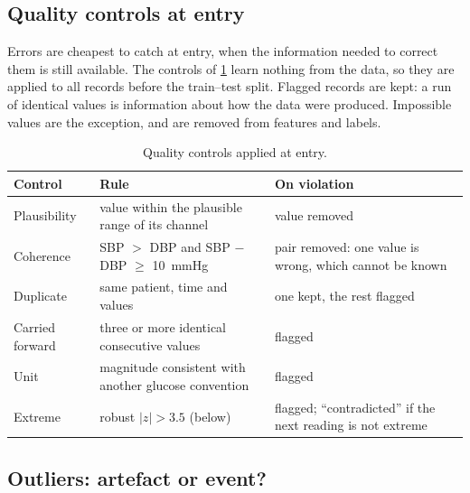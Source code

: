 \documentclass[11pt,a4paper,oneside]{report}
\begin{document}
\subsection{Quality controls at entry}\label{sec:quality}\label{sec:ingestion}

Errors are cheapest to catch at entry, when the information needed to correct them is still available. The controls of \cref{tab:quality-controls} learn nothing from the data, so they are applied to all records before the train--test split. Flagged records are kept: a run of identical values is information about how the data were produced. Impossible values are the exception, and are removed from features and labels.

\begin{table}[htbp]
\centering\footnotesize
\caption{Quality controls applied at entry.}\label{tab:quality-controls}
\begin{tabularx}{\textwidth}{@{}>{\raggedright\arraybackslash}p{2.6cm} X >{\raggedright\arraybackslash}p{4.0cm}@{}}
\toprule
\textbf{Control} & \textbf{Rule} & \textbf{On violation} \\
\midrule
Plausibility & value within the plausible range of its channel & value removed \\
Coherence & SBP $>$ DBP and SBP $-$ DBP $\geq$ 10~mmHg & pair removed: one value is wrong, which cannot be known \\
Duplicate & same patient, time and values & one kept, the rest flagged \\
Carried forward & three or more identical consecutive values & flagged \\
Unit & magnitude consistent with another glucose convention & flagged \\
Extreme & robust $\lvert z\rvert > 3.5$ (below) & flagged; ``contradicted'' if the next reading is not extreme \\
\bottomrule
\end{tabularx}
\end{table}

\subsection{Outliers: artefact or event?}\label{sec:outliers}\label{sec:mad-shrinkage}
\end{document}
